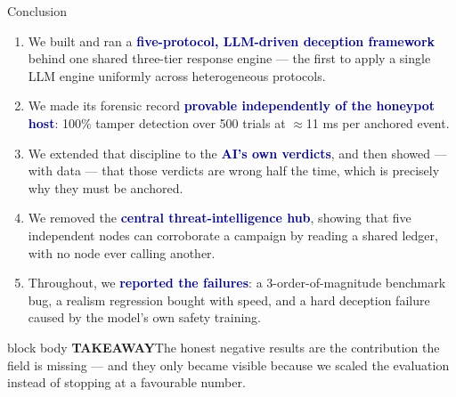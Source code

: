 \documentclass[aspectratio=169,11pt]{beamer}
\newcommand{\hl}[1]{\textcolor{navy}{\textbf{#1}}}
\newcommand{\takeaway}[1]{%
  \vspace{3pt}%
  \begin{beamercolorbox}[wd=\dimexpr\textwidth-10pt\relax,sep=5pt,rounded=true]{block body}%
    {\color{navy}\bfseries\scriptsize TAKEAWAY\;\;}{\scriptsize #1}%
  \end{beamercolorbox}}
\begin{document}
\begin{frame}{Conclusion}
  \footnotesize
  \begin{enumerate}\setlength\itemsep{3pt}
    \item We built and ran a \hl{five-protocol, LLM-driven deception framework} behind one shared
      three-tier response engine --- the first to apply a single LLM engine uniformly across
      heterogeneous protocols.
    \item We made its forensic record \hl{provable independently of the honeypot host}:
      100\% tamper detection over 500 trials at $\approx$11 ms per anchored event.
    \item We extended that discipline to the \hl{AI's own verdicts}, and then showed --- with data ---
      that those verdicts are wrong half the time, which is precisely why they must be anchored.
    \item We removed the \hl{central threat-intelligence hub}, showing that five independent nodes can
      corroborate a campaign by reading a shared ledger, with no node ever calling another.
    \item Throughout, we \hl{reported the failures}: a 3-order-of-magnitude benchmark bug, a realism
      regression bought with speed, and a hard deception failure caused by the model's own safety
      training.
  \end{enumerate}
  \takeaway{The honest negative results are the contribution the field is missing --- and they only became visible because we scaled the evaluation instead of stopping at a favourable number.}
\end{frame}
\end{document}

